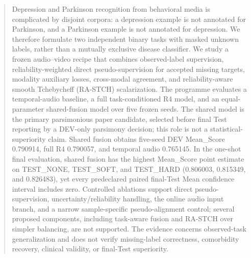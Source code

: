 \begin{abstract}
Depression and Parkinson recognition from behavioral media is complicated by disjoint corpora: a depression example is not annotated for Parkinson, and a Parkinson example is not annotated for depression. We therefore formulate two independent binary tasks with masked unknown labels, rather than a mutually exclusive disease classifier. We study a frozen audio--video recipe that combines observed-label supervision, reliability-weighted direct pseudo-supervision for accepted missing targets, modality auxiliary losses, cross-modal agreement, and reliability-aware smooth Tchebycheff (RA-STCH) scalarization. The programme evaluates a temporal-audio baseline, a full task-conditioned R4 model, and an equal-parameter shared-fusion model over five frozen seeds. The shared model is the primary parsimonious paper candidate, selected before final Test reporting by a DEV-only parsimony decision; this role is not a statistical-superiority claim. Shared fusion obtains five-seed DEV Mean\_Score 0.790914, full R4 0.790057, and temporal audio 0.765145. In the one-shot final evaluation, shared fusion has the highest Mean\_Score point estimate on TEST\_NONE, TEST\_SOFT, and TEST\_HARD (0.806003, 0.815349, and 0.826483), yet every predeclared paired final-Test Mean confidence interval includes zero. Controlled ablations support direct pseudo-supervision, uncertainty/reliability handling, the online audio input branch, and a narrow sample-specific pseudo-alignment control; several proposed components, including task-aware fusion and RA-STCH over simpler balancing, are not supported. The evidence concerns observed-task generalization and does not verify missing-label correctness, comorbidity recovery, clinical validity, or final-Test superiority.
\end{abstract}

